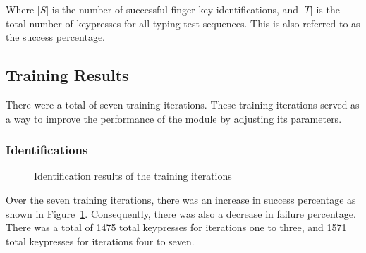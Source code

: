 \documentclass{report}
\begin{document}
Where $|S|$ is the number of successful finger-key identifications, and $|T|$ is
the total number of keypresses for all typing test sequences. This is also
referred to as the success percentage.

\subsection{Training Results}
There were a total of seven training iterations. These training iterations
served as a way to improve the performance of the module by adjusting its
parameters.

\subsubsection{Identifications}

\begin{figure}[H]
	\centering
	\caption{Identification results of the training iterations}
	\label{fig:rd-training-identification}
\end{figure}

Over the seven training iterations, there was an increase in success percentage
as shown in Figure~\ref{fig:rd-training-identification}. Consequently, there was
also a decrease in failure percentage. There was a total of 1475 total
keypresses for iterations one to three, and 1571 total keypresses for iterations
four to seven.
\end{document}
